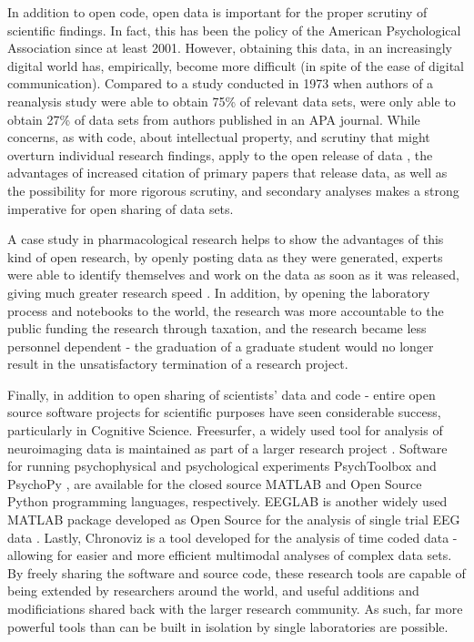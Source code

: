 \documentclass[12pt,a4paper,titlepage]{scrreprt}
\begin{document}
In addition to open code, open data is important for the proper scrutiny of scientific findings. In fact, this has been the policy of the American Psychological Association \parencite{association_publication_2001} since at least 2001. However, obtaining this data, in an increasingly digital world has, empirically, become more difficult (in spite of the ease of digital communication). Compared to a study conducted in 1973 when authors of a reanalysis study were able to obtain 75\% of relevant data sets, \textcite{wicherts_poor_2006} were only able to obtain 27\% of data sets from authors published in an APA journal. While concerns, as with code, about intellectual property, and scrutiny that might overturn individual research findings, apply to the open release of data \parencite{wicherts_publish_2012}, the advantages of increased citation of primary papers that release data, as well as the possibility for more rigorous scrutiny, and secondary analyses makes a strong imperative for open sharing of data sets.

A case study in pharmacological research helps to show the advantages of this kind of open research, by openly posting data as they were generated, experts were able to identify themselves and work on the data as soon as it was released, giving much greater research speed \parencite{woelfle_open_2011}. In addition, by opening the laboratory process and notebooks to the world, the research was more accountable to the public funding the research through taxation, and the research became less personnel dependent - the graduation of a graduate student would no longer result in the unsatisfactory termination of a research project.

Finally, in addition to open sharing of scientists' data and code - entire open source software projects for scientific purposes have seen considerable success, particularly in Cognitive Science. Freesurfer, a widely used tool for analysis of neuroimaging data is maintained as part of a larger research project \parencite{fischl_freesurfer_2012}. Software for running psychophysical and psychological experiments PsychToolbox \parencite{brainard_psychophysics_1997} and PsychoPy \parencite{peirce_psychopypsychophysics_2007,peirce_generating_2008}, are available for the closed source MATLAB and Open Source Python programming languages, respectively. EEGLAB is another widely used MATLAB package developed as Open Source for the analysis of single trial EEG data \parencite{delorme_eeglab:_2004}. Lastly, Chronoviz \parencite{fouse_chronoviz:_2011} is a tool developed for the analysis of time coded data - allowing for easier and more efficient multimodal analyses of complex data sets. By freely sharing the software and source code, these research tools are capable of being extended by researchers around the world, and useful additions and modificiations shared back with the larger research community. As such, far more powerful tools than can be built in isolation by single laboratories are possible.
\end{document}
